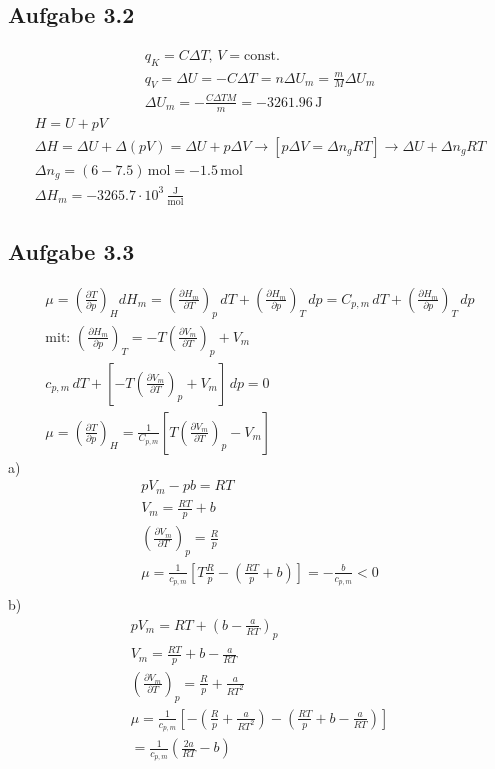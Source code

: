 \documentclass{article}
\begin{document}
\subsection*{Aufgabe 3.2}
\begin{eqnarray*}
    q_K=C\Delta T,\,V=\mathrm{const.}\\
    q_V=\Delta U=-C\Delta T = n \Delta U_m = \frac{m}{M} \Delta U_m\\
    \Delta U_m = -\frac{C\Delta TM}{m}=-3261.96\,\mathrm{J}
\end{eqnarray*}
\begin{eqnarray*}
    H=U+pV\\
    \Delta H=\Delta U + \Delta (pV) = \Delta U + p \Delta V \rightarrow[{p\Delta V = \Delta n_gRT}]\rightarrow \Delta U + \Delta n_g RT\\
    \Delta n_g = (6-7.5)\,\mathrm{mol} = -1.5\,\mathrm{mol}\\
    \Delta H_m = -3265.7\cdot 10^3 \,\mathrm{\frac{J}{mol}}
\end{eqnarray*}

\subsection*{Aufgabe 3.3}
\begin{eqnarray*}
    \mu = \left(\frac{\partial T}{\partial p}\right)_H
    d H_m = \left(\frac{\partial H_m}{\partial T}\right)_p\,dT+\left(\frac{\partial H_m}{\partial p}\right)_T\,dp=C_{p,m}\,dT+\left(\frac{\partial H_m}{\partial p}\right)_T\,dp\\
    \text{mit: } \left(\frac{\partial H_m}{\partial p}\right)_T = -T\left(\frac{\partial V_m}{\partial T}\right)_p + V_m\\
    c_{p,m}\,dT+\left[-T\left(\frac{\partial V_m}{\partial T}\right)_p+V_m\right]\,dp=0\\
    \mu = \left(\frac{\partial T}{\partial p}\right)_H = \frac{1}{C_{p,m}}\left[T\left(\frac{\partial V_m}{\partial T}\right)_p - V_m\right]
\end{eqnarray*}
a)\begin{eqnarray*}
    pV_m-pb=RT\\
    V_m = \frac{RT}{p}+b\\
    \left(\frac{\partial V_m}{\partial T}\right)_p = \frac{R}{p}\\
    \mu = \frac{1}{c_{p,m}}\left[T\frac{R}{p}-\left(\frac{RT}{p}+b\right)\right]=-\frac{b}{c_{p,m}}<0\\
\end{eqnarray*}
b)\begin{eqnarray*}
    pV_m=RT+(b-\frac{a}{RT})_p\\
    V_m = \frac{RT}{p}+b-\frac{a}{RT}\\
    \left(\frac{\partial V_m}{\partial T}\right)_p = \frac{R}{p}+\frac{a}{RT^2}\\
    \mu = \frac{1}{c_{p,m}}\left[-\left(\frac{R}{p}+\frac{a}{RT^2}\right)-\left(\frac{RT}{p}+b-\frac{a}{RT}\right)\right]\\
    = \frac{1}{c_{p,m}}\left(\frac{2a}{RT}-b\right)
\end{eqnarray*}
\end{document}
